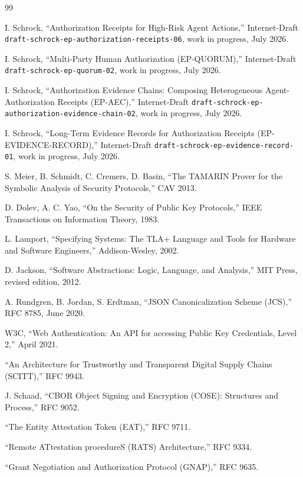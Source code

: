 \documentclass[11pt]{article}
\newcommand{\code}[1]{\texttt{#1}}
\begin{document}
\begin{thebibliography}{99}

 I. Schrock, ``Authorization Receipts for High-Risk Agent Actions,''
Internet-Draft \code{draft-schrock-ep-authorization-receipts-06}, work in progress,
July 2026.

 I. Schrock, ``Multi-Party Human Authorization (EP-QUORUM),''
Internet-Draft \code{draft-schrock-ep-quorum-02}, work in progress, July 2026.

 I. Schrock, ``Authorization Evidence Chains: Composing Heterogeneous
Agent-Authorization Receipts (EP-AEC),'' Internet-Draft
\code{draft-schrock-ep-authorization-evidence-chain-02}, work in progress, July
2026.

 I. Schrock, ``Long-Term Evidence Records for Authorization Receipts
(EP-EVIDENCE-RECORD),'' Internet-Draft \code{draft-schrock-ep-evidence-record-01},
work in progress, July 2026.

 S. Meier, B. Schmidt, C. Cremers, D. Basin, ``The TAMARIN Prover
for the Symbolic Analysis of Security Protocols,'' CAV 2013.

 D. Dolev, A. C. Yao, ``On the Security of Public Key Protocols,'' IEEE
Transactions on Information Theory, 1983.

 L. Lamport, ``Specifying Systems: The TLA+ Language and Tools for
Hardware and Software Engineers,'' Addison-Wesley, 2002.

 D. Jackson, ``Software Abstractions: Logic, Language, and
Analysis,'' MIT Press, revised edition, 2012.

 A. Rundgren, B. Jordan, S. Erdtman, ``JSON Canonicalization Scheme
(JCS),'' RFC 8785, June 2020.

 W3C, ``Web Authentication: An API for accessing Public Key
Credentials, Level 2,'' April 2021.

 ``An Architecture for Trustworthy and Transparent Digital Supply
Chains (SCITT),'' RFC 9943.

 J. Schaad, ``CBOR Object Signing and Encryption (COSE): Structures
and Process,'' RFC 9052.

 ``The Entity Attestation Token (EAT),'' RFC 9711.

 ``Remote ATtestation procedureS (RATS) Architecture,'' RFC 9334.

 ``Grant Negotiation and Authorization Protocol (GNAP),'' RFC 9635.


\end{thebibliography}
\end{document}
